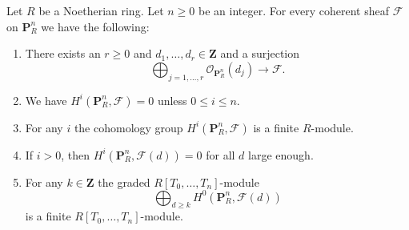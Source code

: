 %
\begin{lemma}
\label{lemma-coherent-projective}
Let $R$ be a Noetherian ring.
Let $n \geq 0$ be an integer.
For every coherent sheaf $\mathcal{F}$ on $\mathbf{P}^n_R$
we have the following:
\begin{enumerate}
\item There exists an $r \geq 0$ and
$d_1, \ldots, d_r \in \mathbf{Z}$ and a surjection
$$
\bigoplus\nolimits_{j = 1, \ldots, r}
\mathcal{O}_{\mathbf{P}^n_R}(d_j)
\longrightarrow
\mathcal{F}.
$$
\item We have $H^i(\mathbf{P}^n_R, \mathcal{F}) = 0$ unless
$0 \leq i \leq n$.
\item For any $i$ the cohomology group $H^i(\mathbf{P}^n_R, \mathcal{F})$
is a finite $R$-module.
\item If $i > 0$, then
$H^i(\mathbf{P}^n_R, \mathcal{F}(d)) = 0$ for all $d$ large enough.
\item For any $k \in \mathbf{Z}$ the graded $R[T_0, \ldots, T_n]$-module
$$
\bigoplus\nolimits_{d \geq k} H^0(\mathbf{P}^n_R, \mathcal{F}(d))
$$
is a finite $R[T_0, \ldots, T_n]$-module.
\end{enumerate}
\end{lemma}

